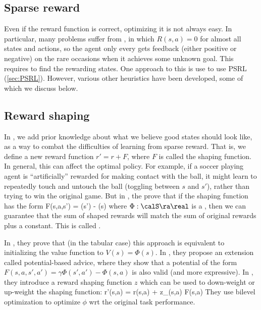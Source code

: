 \subsection{Sparse reward}

Even if the reward function is correct, optimizing it is not always easy.
In particular, many problems suffer from ,
in which $R(s,a)=0$ for almost all states and actions, so the agent
only every gets feedback (either positive or negative) on the rare occasions
when it achieves some unknown goal.
This requires 
\citep{Osband2019}
to find the rewarding states.
One approach to this is use to use PSRL (\cref{sec:PSRL}).
However, various other heuristics have been developed,
some of which we discuss below.


\subsection{Reward shaping}
\label{sec:rewardShaping}

In  ,
we add prior knowledge about what we believe good states should look like,
as a way to combat the difficulties of learning from sparse reward.
That is, we define a new reward function $r' = r + F$,
where $F$ is called the shaping function.
In general, this can affect the optimal policy.
For example, if a soccer playing agent is ``artificially''
rewarded for making contact with the ball,
it might learn to repeatedly touch and untouch the ball
(toggling between $s$ and $s'$), rather than
trying to win the original game.
But in \citep{Ng99},
the prove that if the shaping function has the form
\be
F(s,a,s') = \gamma \Phi(s') - \Phi(s)
\ee
where $\Phi: \calS \ra \real$
is a ,
then we can guarantee that the sum of shaped rewards
will match the sum of original rewards plus a constant.
This is called .

In \citep{Wiewiora2003}, they prove that (in the tabular case)
this approach
is equivalent to initializing the value function
to $V(s)=\Phi(s)$.
In \citep{Tessler2019},
they propose
an extension called potential-based advice,
where they show that a potential of the form
$F(s,a,s',a') = \gamma \Phi(s',a') - \Phi(s,a)$
is also valid (and more expressive).
In \citep{Hu2020}, they introduce a reward shaping function $z$
which can be used to down-weight or up-weight the
shaping function:
\be
r'(s,a) = r(s,a) + z_{\phi}(s,a) F(s,a)
\ee
They use bilevel optimization to optimize $\phi$
wrt the original task performance.


